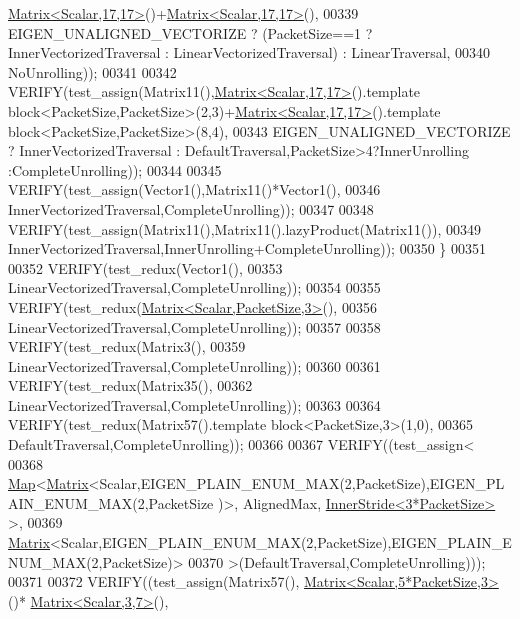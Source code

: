 \begin{DoxyCode}
      \hyperlink{group___core___module_class_eigen_1_1_matrix}{Matrix<Scalar,17,17>}()+\hyperlink{group___core___module_class_eigen_1_1_matrix}{Matrix<Scalar,17,17>}(),
00339         EIGEN\_UNALIGNED\_VECTORIZE ? (PacketSize==1 ? InnerVectorizedTraversal : LinearVectorizedTraversal) 
      : LinearTraversal,
00340         NoUnrolling));
00341         
00342       VERIFY(test\_assign(Matrix11(),\hyperlink{group___core___module_class_eigen_1_1_matrix}{Matrix<Scalar,17,17>}().\textcolor{keyword}{template} 
      block<PacketSize,PacketSize>(2,3)+\hyperlink{group___core___module_class_eigen_1_1_matrix}{Matrix<Scalar,17,17>}().\textcolor{keyword}{template} block<PacketSize,PacketSize>(8,4),
00343         EIGEN\_UNALIGNED\_VECTORIZE ? InnerVectorizedTraversal : DefaultTraversal,PacketSize>4?InnerUnrolling
      :CompleteUnrolling));
00344 
00345       VERIFY(test\_assign(Vector1(),Matrix11()*Vector1(),
00346                          InnerVectorizedTraversal,CompleteUnrolling));
00347 
00348       VERIFY(test\_assign(Matrix11(),Matrix11().lazyProduct(Matrix11()),
00349                          InnerVectorizedTraversal,InnerUnrolling+CompleteUnrolling));
00350     \}
00351     
00352     VERIFY(test\_redux(Vector1(),
00353       LinearVectorizedTraversal,CompleteUnrolling));
00354 
00355     VERIFY(test\_redux(\hyperlink{group___core___module_class_eigen_1_1_matrix}{Matrix<Scalar,PacketSize,3>}(),
00356       LinearVectorizedTraversal,CompleteUnrolling));
00357 
00358     VERIFY(test\_redux(Matrix3(),
00359       LinearVectorizedTraversal,CompleteUnrolling));
00360 
00361     VERIFY(test\_redux(Matrix35(),
00362       LinearVectorizedTraversal,CompleteUnrolling));
00363 
00364     VERIFY(test\_redux(Matrix57().\textcolor{keyword}{template} block<PacketSize,3>(1,0),
00365       DefaultTraversal,CompleteUnrolling));
00366 
00367     VERIFY((test\_assign<
00368             \hyperlink{group___core___module_class_eigen_1_1_map}{Map}<\hyperlink{group___core___module_class_eigen_1_1_matrix}{Matrix}<Scalar,EIGEN\_PLAIN\_ENUM\_MAX(2,PacketSize),EIGEN\_PLAIN\_ENUM\_MAX(2,PacketSize
      )>, AlignedMax, \hyperlink{class_eigen_1_1_inner_stride}{InnerStride<3*PacketSize>} >,
00369             \hyperlink{group___core___module_class_eigen_1_1_matrix}{Matrix}<Scalar,EIGEN\_PLAIN\_ENUM\_MAX(2,PacketSize),EIGEN\_PLAIN\_ENUM\_MAX(2,PacketSize)>
00370             >(DefaultTraversal,CompleteUnrolling)));
00371 
00372     VERIFY((test\_assign(Matrix57(), \hyperlink{group___core___module_class_eigen_1_1_matrix}{Matrix<Scalar,5*PacketSize,3>}()*
      \hyperlink{group___core___module_class_eigen_1_1_matrix}{Matrix<Scalar,3,7>}(),

\end{DoxyCode}

